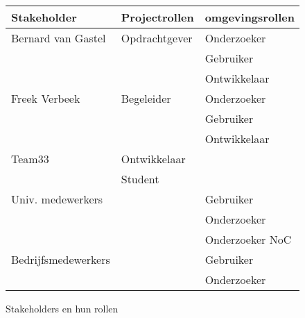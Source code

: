 \documentclass[a4paper,11pt,twoside,draft]{article}
\begin{document}
\begin{figure}
{\tiny
\begin{center}
\begin{tabular}{lll}\hline
{\bf Stakeholder}    & {\bf Projectrollen}   & {\bf omgevingsrollen} \\\hline
Bernard van Gastel   & Opdrachtgever         & Onderzoeker \\
                     &                       & Gebruiker \\
                     &                       & Ontwikkelaar \\
Freek Verbeek        & Begeleider            & Onderzoeker \\
                     &                       & Gebruiker \\
                     &                       & Ontwikkelaar \\
Team33               & Ontwikkelaar          & \\
                     & Student               & \\
Univ. medewerkers    &                       & Gebruiker \\
                     &                       & Onderzoeker \\
                     &                       & Onderzoeker NoC \\
Bedrijfsmedewerkers  &                       & Gebruiker \\
                     &                       & Onderzoeker \\
\hline
\end{tabular}
\end{center}
}%
\caption{Stakeholders en hun rollen}\label{fig:stakeholders}
\end{figure}
\end{document}
